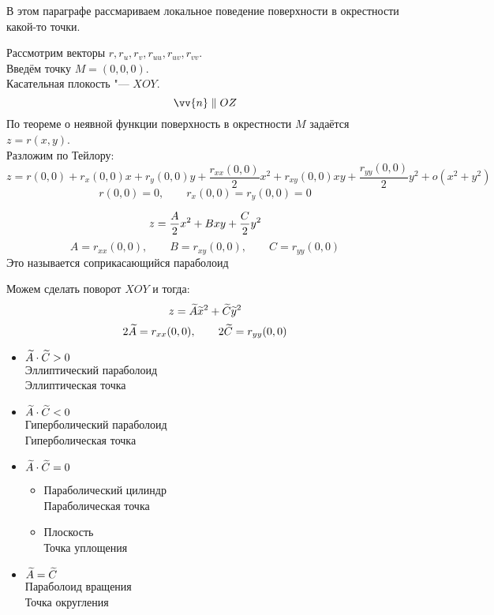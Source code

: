 В этом параграфе рассмариваем локальное поведение поверхности в окрестности какой-то точки.

Рассмотрим векторы $ r, r_u, r_v, r_{uu}, r_{uv}, r_{vv} $. \\
Введём точку $ M = (0, 0, 0) $. \\
Касательная плокость "--- $ XOY $.
$$ \vv{n} \parallel OZ $$
По теореме о неявной функции поверхность в окрестности $ M $ задаётся $ z = r(x, y) $. \\
Разложим по Тейлору:
$$ z = r(0, 0) + r_x(0, 0)x + r_y(0, 0)y + \frac{r_{xx}(0, 0)}2x^2 + r_{xy}(0, 0)xy + \frac{r_{yy}(0, 0)}2y^2 + o(x^2 + y^2) $$
$$ r(0, 0) = 0, \qquad r_x(0, 0) = r_y(0, 0) = 0 $$

\begin{definition}
	$$ z = \half[A]x^2 + Bxy + \half[C]y^2 $$
	$$ A = r_{xx}(0, 0), \qquad B = r_{xy}(0, 0), \qquad C = r_{yy}(0, 0) $$
	Это называется соприкасающийся параболоид
\end{definition}

Можем сделать поворот $ XOY $ и тогда:
$$ z = \vawe{A}\vawe{x}^2 + \vawe{C}\vawe{y}^2 $$
$$ 2\vawe A = r_{xx}(0, 0), \qquad 2\vawe C = r_{yy}(0, 0) $$

\begin{definition}[классификация]
	\hfill
	\begin{itemize}
		\item $ \vawe{A} \cdot \vawe{C} > 0 $ \\
		Эллиптический параболоид \\
		Эллиптическая точка
		\item $ \vawe{A} \cdot \vawe{C} < 0 $ \\
		Гиперболический параболоид \\
		Гиперболическая точка
		\item $ \vawe{A} \cdot \vawe{C} = 0 $
		\begin{itemize}
			\item Параболический цилиндр \\
			Параболическая точка
			\item Плоскость \\
			Точка уплощения
		\end{itemize}
		\item $ \vawe{A} = \vawe{C} $ \\
		Параболоид вращения \\
		Точка округления
	\end{itemize}
\end{definition}

